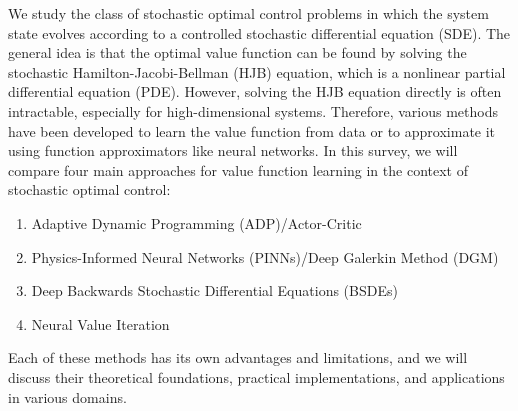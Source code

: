 We study the class of stochastic optimal control problems in which the system state evolves according to a controlled stochastic differential equation (SDE). The general idea is that the optimal value function can be found by solving the stochastic Hamilton-Jacobi-Bellman (HJB) equation, which is a nonlinear partial differential equation (PDE). However, solving the HJB equation directly is often intractable, especially for high-dimensional systems. Therefore, various methods have been developed to learn the value function from data or to approximate it using function approximators like neural networks. In this survey, we will compare four main approaches for value function learning in the context of stochastic optimal control:
\begin{enumerate}
    \item Adaptive Dynamic Programming (ADP)/Actor-Critic
    \item Physics-Informed Neural Networks (PINNs)/Deep Galerkin Method (DGM)
    \item Deep Backwards Stochastic Differential Equations (BSDEs)
    \item Neural Value Iteration
\end{enumerate}
Each of these methods has its own advantages and limitations, and we will discuss their theoretical foundations, practical implementations, and applications in various domains.


